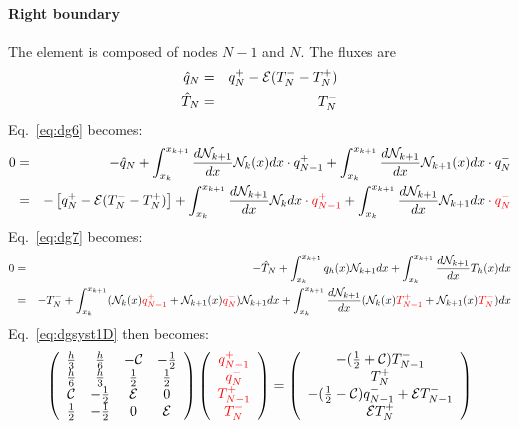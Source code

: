 \paragraph{Right boundary} The element is composed of nodes $N-1$ and $N$. The fluxes are 
\begin{eqnarray}
\hat{q}_N &=& q_N^+ -{\cal E} (T_N^--T_N^+) \nonumber  \\
\hat{T}_N &=& T_N^- \nonumber
\end{eqnarray}
Eq.~\eqref{eq:dg6} becomes:
\begin{eqnarray}
0 
&=& -\hat{q}_{N} 
+ \int_{x_k}^{x_{k+1}} \frac{d{\mathcal{N}}_{k+1}}{dx} {\mathcal{N}}_k(x) dx \cdot q_{N-1}^+ 
+ \int_{x_k}^{x_{k+1}} \frac{d{\mathcal{N}}_{k+1}}{dx} {\mathcal{N}}_{k+1}(x) dx \cdot q_{N}^- \nonumber\\ 
&=& - \left[ q_N^+ -{\cal E} (T_N^--T_N^+) \right] 
+ \int_{x_k}^{x_{k+1}} \frac{d{\mathcal{N}}_{k+1}}{dx} {\mathcal{N}}_k dx \cdot {\color{red}q_{N-1}^+} 
+ \int_{x_k}^{x_{k+1}} \frac{d{\mathcal{N}}_{k+1}}{dx} {\mathcal{N}}_{k+1}dx \cdot {\color{red}q_{N}^-} 
\end{eqnarray}
Eq.~\eqref{eq:dg7} becomes:
\begin{eqnarray}
0
&=& -\hat{T}_{N} 
+ \int_{x_k}^{x_{k+1}}  q_h(x) {\mathcal{N}}_{k+1} dx
+ \int_{x_k}^{x_{k+1}} \frac{d{\mathcal{N}}_{k+1} }{dx} T_h(x) dx  \nonumber\\
&=&-T_N^- + \int_{x_k}^{x_{k+1}} ({\mathcal{N}}_k(x) {\color{red}q_{N-1}^+} + {\mathcal{N}}_{k+1}(x) {\color{red}q_{N}^-})  {\mathcal{N}}_{k+1} dx
+ \int_{x_k}^{x_{k+1}} \frac{d{\mathcal{N}}_{k+1} }{dx} ({\mathcal{N}}_k(x) {\color{red} T_{N-1}^+} + {\mathcal{N}}_{k+1}(x) {\color{red}T_{N}^-}) dx
\nonumber 
\end{eqnarray}
Eq.~\eqref{eq:dgsyst1D} then becomes:
\begin{eqnarray}
\left(
\begin{array}{cccc}
\frac{h}{3}    &  \frac{h}{6} & -{\cal C}   &-\frac{1}{2} \\
\frac{h}{6}    &  \frac{h}{3} & \frac{1}{2} & \frac{1}{2} \\
{\cal C}    & -\frac{1}{2} & {\cal E} & 0\\
\frac{1}{2} & -\frac{1}{2} & 0 & {\cal E}
\end{array}
\right) \left(
\begin{array}{c}
     \color{red}{q_{N-1}^+}  \\
     \color{red}{q_{N}^-} \\
     \color{red}{T_{N-1}^+} \\
     \color{red}{T_{N}^-}
\end{array}
\right)=\left(
\begin{array}{cc}
     -(\frac{1}{2}+{\cal{C}}) T_{N-1}^-  \\
      T_{N}^+ \\
     -(\frac{1}{2}-{\cal{C}})q_{N-1}^-+{\cal{E}} T_{N-1}^-  \\
      {\cal{E}} T_{N}^+
\end{array}
\right)
\label{eq:dgsyst1Dright}
\end{eqnarray}


